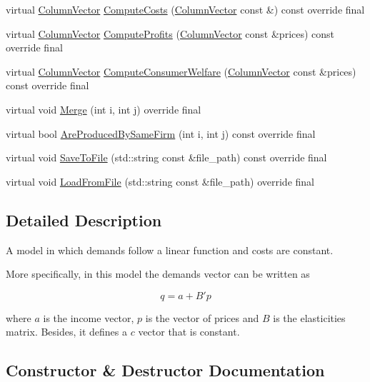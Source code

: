 \begin{DoxyCompactItemize}
\item 
virtual \hyperlink{classColumnVector}{Column\+Vector} \hyperlink{classLinearDemandsConstantCosts_a55e0f15cfc00d8c21fbfd95843c06c44}{Compute\+Costs} (\hyperlink{classColumnVector}{Column\+Vector} const \&) const override final
\item 
virtual \hyperlink{classColumnVector}{Column\+Vector} \hyperlink{classLinearDemandsConstantCosts_a48b52dab01d2cf45beae51eab615f7ae}{Compute\+Profits} (\hyperlink{classColumnVector}{Column\+Vector} const \&prices) const override final
\item 
virtual \hyperlink{classColumnVector}{Column\+Vector} \hyperlink{classLinearDemandsConstantCosts_a9d3fa6a3b151c2f1703f23bbee6954cb}{Compute\+Consumer\+Welfare} (\hyperlink{classColumnVector}{Column\+Vector} const \&prices) const override final
\item 
virtual void \hyperlink{classLinearDemandsConstantCosts_a0ee422d927b5a85f9aba8782b02f537b}{Merge} (int i, int j) override final
\item 
virtual bool \hyperlink{classLinearDemandsConstantCosts_a91ba117b740d0e5cb5d6efd63d61a5f6}{Are\+Produced\+By\+Same\+Firm} (int i, int j) const override final
\item 
virtual void \hyperlink{classLinearDemandsConstantCosts_aef2823751866a4933a8611dd4622d78b}{Save\+To\+File} (std\+::string const \&file\+\_\+path) const override final
\item 
virtual void \hyperlink{classLinearDemandsConstantCosts_a075add461e368629b9dfd8f72033e2ad}{Load\+From\+File} (std\+::string const \&file\+\_\+path) override final
\end{DoxyCompactItemize}


\subsection{Detailed Description}
A model in which demands follow a linear function and costs are constant.

More specifically, in this model the demands vector can be written as

\begin{equation} q = a + B' p \end{equation}

where $ a $ is the income vector, $ p $ is the vector of prices and $ B $ is the elasticities\textquotesingle{} matrix. Besides, it defines a $ c $ vector that is constant. 

\subsection{Constructor \& Destructor Documentation}
\mbox{\label{classLinearDemandsConstantCosts_a79e3cc71f551a3ad3ecfd5ea3818a6c0}} 
